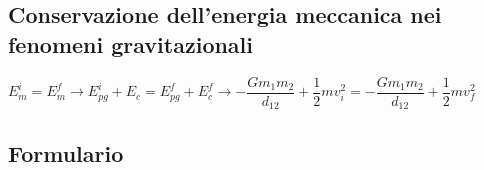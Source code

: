 		\subsection{Conservazione dell'energia meccanica nei fenomeni gravitazionali}
			\par$E_m^i=E_m^f \longrightarrow E_{pg}^i+E_c=E_{pg}^f+E_c^f \rightarrow-\dfrac{Gm_1m_2}{d_{12}}+\dfrac{1}{2}mv_i^2=-\dfrac{Gm_1m_2}{d_{12}}+\dfrac{1}{2}mv_f^2$
	\subsection{Formulario}				